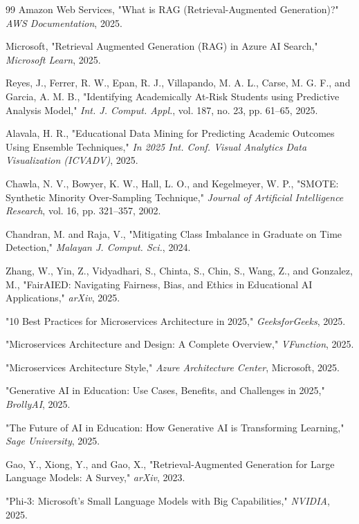 \documentclass[conference]{IEEEtran}
\begin{document}
\begin{thebibliography}{99}
 Amazon Web Services, "What is RAG (Retrieval-Augmented Generation)?" \textit{AWS Documentation}, 2025.

 Microsoft, "Retrieval Augmented Generation (RAG) in Azure AI Search," \textit{Microsoft Learn}, 2025.

 Reyes, J., Ferrer, R. W., Epan, R. J., Villapando, M. A. L., Carse, M. G. F., and Garcia, A. M. B., "Identifying Academically At-Risk Students using Predictive Analysis Model," \textit{Int. J. Comput. Appl.}, vol. 187, no. 23, pp. 61–65, 2025.

 Alavala, H. R., "Educational Data Mining for Predicting Academic Outcomes Using Ensemble Techniques," \textit{In 2025 Int. Conf. Visual Analytics Data Visualization (ICVADV)}, 2025.

 Chawla, N. V., Bowyer, K. W., Hall, L. O., and Kegelmeyer, W. P., "SMOTE: Synthetic Minority Over-Sampling Technique," \textit{Journal of Artificial Intelligence Research}, vol. 16, pp. 321–357, 2002.

 Chandran, M. and Raja, V., "Mitigating Class Imbalance in Graduate on Time Detection," \textit{Malayan J. Comput. Sci.}, 2024.

 Zhang, W., Yin, Z., Vidyadhari, S., Chinta, S., Chin, S., Wang, Z., and Gonzalez, M., "FairAIED: Navigating Fairness, Bias, and Ethics in Educational AI Applications," \textit{arXiv}, 2025.

 "10 Best Practices for Microservices Architecture in 2025," \textit{GeeksforGeeks}, 2025.

 "Microservices Architecture and Design: A Complete Overview," \textit{VFunction}, 2025.

 "Microservices Architecture Style," \textit{Azure Architecture Center}, Microsoft, 2025.

 "Generative AI in Education: Use Cases, Benefits, and Challenges in 2025," \textit{BrollyAI}, 2025.

 "The Future of AI in Education: How Generative AI is Transforming Learning," \textit{Sage University}, 2025.

 Gao, Y., Xiong, Y., and Gao, X., "Retrieval-Augmented Generation for Large Language Models: A Survey," \textit{arXiv}, 2023.

 "Phi-3: Microsoft's Small Language Models with Big Capabilities," \textit{NVIDIA}, 2025.


\end{thebibliography}
\end{document}

